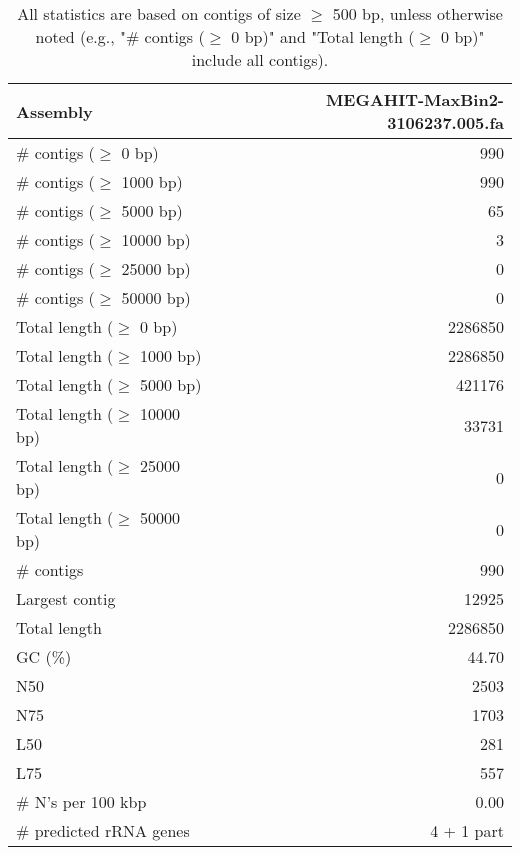 \documentclass[12pt,a4paper]{article}
\begin{document}
\begin{table}[ht]
\begin{center}
\caption{All statistics are based on contigs of size $\geq$ 500 bp, unless otherwise noted (e.g., "\# contigs ($\geq$ 0 bp)" and "Total length ($\geq$ 0 bp)" include all contigs).}
\begin{tabular}{|l*{1}{|r}|}
\hline
Assembly & MEGAHIT-MaxBin2-3106237.005.fa \\ \hline
\# contigs ($\geq$ 0 bp) & 990 \\ \hline
\# contigs ($\geq$ 1000 bp) & 990 \\ \hline
\# contigs ($\geq$ 5000 bp) & 65 \\ \hline
\# contigs ($\geq$ 10000 bp) & 3 \\ \hline
\# contigs ($\geq$ 25000 bp) & 0 \\ \hline
\# contigs ($\geq$ 50000 bp) & 0 \\ \hline
Total length ($\geq$ 0 bp) & 2286850 \\ \hline
Total length ($\geq$ 1000 bp) & 2286850 \\ \hline
Total length ($\geq$ 5000 bp) & 421176 \\ \hline
Total length ($\geq$ 10000 bp) & 33731 \\ \hline
Total length ($\geq$ 25000 bp) & 0 \\ \hline
Total length ($\geq$ 50000 bp) & 0 \\ \hline
\# contigs & 990 \\ \hline
Largest contig & 12925 \\ \hline
Total length & 2286850 \\ \hline
GC (\%) & 44.70 \\ \hline
N50 & 2503 \\ \hline
N75 & 1703 \\ \hline
L50 & 281 \\ \hline
L75 & 557 \\ \hline
\# N's per 100 kbp & 0.00 \\ \hline
\# predicted rRNA genes & 4 + 1 part \\ \hline
\end{tabular}
\end{center}
\end{table}
\end{document}
